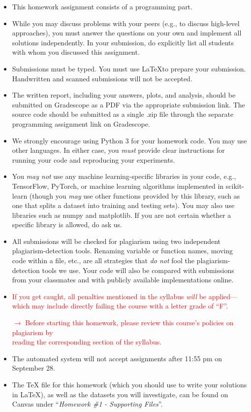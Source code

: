 \documentclass{article}
\begin{document}
\begin{itemize}
    \item This homework assignment consists of a programming part. 
    \item While you may discuss problems with your peers (e.g., to discuss high-level approaches), you must answer the questions on your own and implement all solutions independently. In your submission, do explicitly list all students with whom you discussed this assignment. 
    \item Submissions must be typed. You must use \LaTeX to prepare your submission. Handwritten and scanned submissions will not be accepted. 
    \item The written report, including your answers, plots, and analysis, should be submitted on Gradescope as a PDF via the appropriate submission link. The source code should be submitted as a single .zip file through the separate programming assignment link on Gradescope.
    \item We strongly encourage using Python 3 for your homework code. You may use other languages. In either case, you \textit{must} provide clear instructions for running your code and reproducing your experiments. 
    \item You \textit{may not} use any machine learning-specific libraries in your code, e.g., TensorFlow, PyTorch, or machine learning algorithms implemented in scikit-learn (though you \textit{may} use other functions provided by this library, such as one that splits a dataset into training and testing sets). You may also use libraries such as numpy and matplotlib. If you are not certain whether a specific library is allowed, do ask us.
    \item All submissions will be checked for plagiarism using two independent plagiarism-detection tools. Renaming variable or function names, moving code within a file, etc., are all strategies that \textit{do not} fool the plagiarism-detection tools we use. Your code will also be compared with submissions from your classmates and with publicly available implementations online. 
    \item \textcolor{red}{If you get caught, all penalties mentioned in the syllabus \textit{will} be applied---which may include directly failing the course with a letter grade of ``F''}.
    \begin{center}
        \textcolor{red}{$\rightarrow$ Before starting this homework, please review this course's policies on plagiarism by  \\reading the corresponding section of the syllabus.}
    \end{center}
    \item The automated system will not accept assignments after 11:55 pm on September 28. 
    \item The TeX file for this homework (which you should use to write your solutions in \LaTeX), as well as the datasets you will investigate, can be found on Canvas under ``\textit{Homework \#1 - Supporting Files}''. 
\end{itemize}
\end{document}
